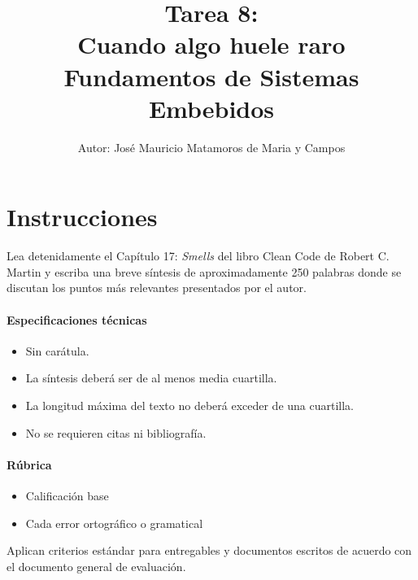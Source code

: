 \documentclass[letterpaper,10.5pt]{article}
\title{Tarea 8:\\Cuando algo huele raro\\
{\large Fundamentos de Sistemas Embebidos}}
\author{\footnotesize Autor: José Mauricio Matamoros de Maria y Campos}
\date{}
\begin{document}
\maketitle
\thispagestyle{empty}


\section{Instrucciones}%
\label{sec:instructions}
Lea detenidamente el Capítulo 17: \emph{Smells} del libro Clean Code de Robert C. Martin y escriba una breve síntesis de aproximadamente 250 palabras donde se discutan los puntos más relevantes presentados por el autor.

\paragraph{Especificaciones técnicas}
\begin{itemize}
	\item Sin carátula.
	\item La síntesis deberá ser de al menos media cuartilla.
	\item La longitud máxima del texto no deberá exceder de una cuartilla.
	\item No se requieren citas ni bibliografía.
\end{itemize}

\paragraph{Rúbrica}
\begin{itemize}
	\item {} Calificación base
	\item {} Cada error ortográfico o gramatical
\end{itemize}
Aplican criterios estándar para entregables y documentos escritos de acuerdo con el documento general de evaluación.
\end{document}
